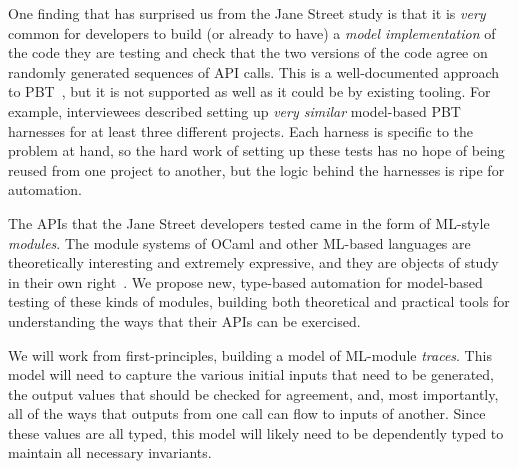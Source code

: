 

One finding that has surprised us from the Jane Street study
is that it is {\em very} common for developers to
build (or already to have) a {\em model implementation} of the code
they are testing and
check that the two versions of the code agree on randomly generated
sequences of API calls.
This is a well-documented approach to PBT~\cite{hughes_experiences_2016}, but it
is not supported as well as it could be by existing tooling. For example,
interviewees described setting up {\em very similar}
model-based PBT harnesses for at least three different projects. Each harness
is specific to the problem at hand, so the hard work of setting up these tests
has no hope of being reused from one project to another, but the logic behind
the harnesses is ripe for automation.

The APIs that the Jane Street developers tested came in the form of ML-style
{\em modules}. The module systems of OCaml and other
ML-based languages are theoretically interesting and extremely expressive, and
they are objects of study in their own right~\cite{macqueen_modules_1984}. We propose
new, type-based automation for model-based testing of these kinds of modules,
building both theoretical and practical tools for understanding the ways that
their APIs can be exercised.

We will work from first-principles, building a model of ML-module {\em traces}.
This model will need to capture the various initial inputs that need to be
generated, the output values that should be checked for agreement, and, most
importantly, all of the ways that outputs from one call can flow to inputs of
another. Since these values are all typed, this model will likely need to be
dependently typed to maintain all necessary invariants.

